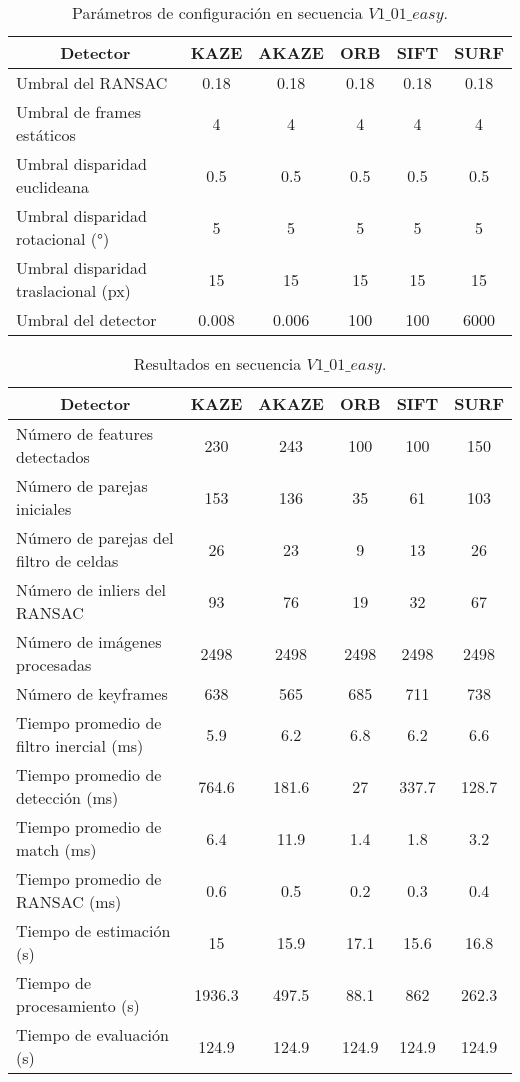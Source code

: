 \begin{table}[htbp]
	\caption{Parámetros de configuración en secuencia $V1\_01\_easy$.}
	\begin{tabular}{|l|c|c|c|c|c|}
		\hline
		\multicolumn{1}{|c|}{\textbf{Detector}} & \textbf{KAZE} & \textbf{AKAZE} & \textbf{ORB} & \textbf{SIFT} & \textbf{SURF} \\ \hline
		Umbral del RANSAC & 0.18 & 0.18 & 0.18 & 0.18 & 0.18 \\ \hline
		Umbral de frames estáticos & 4 & 4 & 4 & 4 & 4 \\ \hline
		Umbral disparidad euclideana & 0.5 & 0.5 & 0.5 & 0.5 & 0.5 \\ \hline
		Umbral disparidad rotacional (°) & 5 & 5 & 5 & 5 & 5 \\ \hline
		Umbral disparidad traslacional (px) & 15 & 15 & 15 & 15 & 15 \\ \hline
		Umbral del detector & 0.008 & 0.006 & 100 & 100 & 6000 \\ \hline
	\end{tabular}
	\label{Tabla/Parametros/V1_01_easy}
\end{table}

\begin{table}[htbp]
	\caption{Resultados en secuencia $V1\_ 01\_ easy$.}
	\begin{tabular}{|l|c|c|c|c|c|}
		\hline
		\multicolumn{1}{|c|}{\textbf{Detector}} & \textbf{KAZE} & \textbf{AKAZE} & \textbf{ORB} & \textbf{SIFT} & \textbf{SURF} \\ \hline
		Número de features detectados & 230 & 243 & 100 & 100 & 150 \\ \hline
		Número de parejas iniciales & 153 & 136 & 35 & 61 & 103 \\ \hline
		Número de parejas del filtro de celdas & 26 & 23 & 9 & 13 & 26 \\ \hline
		Número de inliers del RANSAC & 93 & 76 & 19 & 32 & 67 \\ \hline
		Número de imágenes procesadas & 2498 & 2498 & 2498 & 2498 & 2498 \\ \hline
		Número de keyframes & 638 & 565 & 685 & 711 & 738 \\ \hline
		Tiempo promedio de filtro inercial (ms) & 5.9 & 6.2 & 6.8 & 6.2 & 6.6 \\ \hline
		Tiempo promedio de detección  (ms) & 764.6 & 181.6 & 27 & 337.7 & 128.7 \\ \hline
		Tiempo promedio de match (ms) & 6.4 & 11.9 & 1.4 & 1.8 & 3.2 \\ \hline
		Tiempo promedio de RANSAC (ms) & 0.6 & 0.5 & 0.2 & 0.3 & 0.4 \\ \hline
		Tiempo de estimación (s) & 15 & 15.9 & 17.1 & 15.6 & 16.8 \\ \hline
		Tiempo de  procesamiento (s) & 1936.3 & 497.5 & 88.1 & 862 & 262.3 \\ \hline
		Tiempo de evaluación (s) & 124.9 & 124.9 & 124.9 & 124.9 & 124.9 \\ \hline
	\end{tabular}
	\label{Tabla/Resultados/V1_01_easy}
\end{table}


